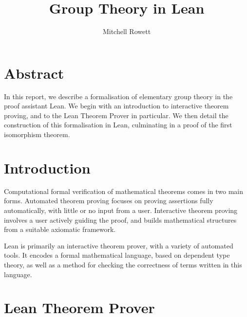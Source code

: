 \documentclass[runningheads,a4paper]{llncs}
\renewcommand{\-}{\setminus}
\begin{document}
\mainmatter 

\title{Group Theory in Lean}


\author{Mitchell Rowett}



\tocauthor{{}}

\maketitle

\medskip

\begingroup
\let\clearpage\relax
\tableofcontents
\endgroup

\pagebreak

\section*{Abstract}

In this report, we describe a formalisation of elementary group theory in the proof assistant Lean. We begin with an introduction to interactive theorem proving, and to the Lean Theorem Prover in particular. We then detail the construction of this formalisation in Lean, culminating in a proof of the first isomorphism theorem.

\section{Introduction}

Computational formal verification of mathematical theorems comes in two main forms. Automated theorem proving focuses on proving assertions fully automatically, with little or no input from a user. Interactive theorem proving involves a user actively guiding the proof, and builds mathematical structures from a suitable axiomatic framework.

Lean is primarily an interactive theorem prover, with a variety of automated tools. It encodes a formal mathematical language, based on dependent type theory, as well as a method for checking the correctness of terms written in this language.

\section{Lean Theorem Prover}
\end{document}
